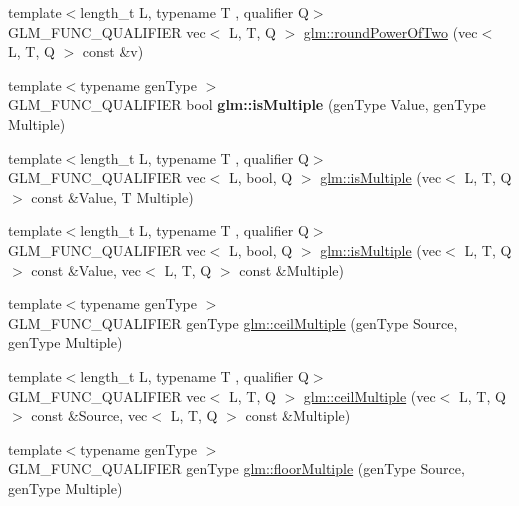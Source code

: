 \begin{DoxyCompactItemize}
\item 
{\footnotesize template$<$length\+\_\+t L, typename T , qualifier Q$>$ }\\G\+L\+M\+\_\+\+F\+U\+N\+C\+\_\+\+Q\+U\+A\+L\+I\+F\+I\+ER vec$<$ L, T, Q $>$ \hyperlink{group__gtc__round_ga258802a7d55c03c918f28cf4d241c4d0}{glm\+::round\+Power\+Of\+Two} (vec$<$ L, T, Q $>$ const \&v)
\item 
\mbox{\label{round_8inl_a1749b696a2f7a956da67d67a557ae134}} 
{\footnotesize template$<$typename gen\+Type $>$ }\\G\+L\+M\+\_\+\+F\+U\+N\+C\+\_\+\+Q\+U\+A\+L\+I\+F\+I\+ER bool {\bfseries glm\+::is\+Multiple} (gen\+Type Value, gen\+Type Multiple)
\item 
{\footnotesize template$<$length\+\_\+t L, typename T , qualifier Q$>$ }\\G\+L\+M\+\_\+\+F\+U\+N\+C\+\_\+\+Q\+U\+A\+L\+I\+F\+I\+ER vec$<$ L, bool, Q $>$ \hyperlink{group__gtc__round_ga354caf634ef333d9cb4844407416256a}{glm\+::is\+Multiple} (vec$<$ L, T, Q $>$ const \&Value, T Multiple)
\item 
{\footnotesize template$<$length\+\_\+t L, typename T , qualifier Q$>$ }\\G\+L\+M\+\_\+\+F\+U\+N\+C\+\_\+\+Q\+U\+A\+L\+I\+F\+I\+ER vec$<$ L, bool, Q $>$ \hyperlink{group__gtc__round_gabb4360e38c0943d8981ba965dead519d}{glm\+::is\+Multiple} (vec$<$ L, T, Q $>$ const \&Value, vec$<$ L, T, Q $>$ const \&Multiple)
\item 
{\footnotesize template$<$typename gen\+Type $>$ }\\G\+L\+M\+\_\+\+F\+U\+N\+C\+\_\+\+Q\+U\+A\+L\+I\+F\+I\+ER gen\+Type \hyperlink{group__gtc__round_ga1d89ac88582aaf4d5dfa5feb4a376fd4}{glm\+::ceil\+Multiple} (gen\+Type Source, gen\+Type Multiple)
\item 
{\footnotesize template$<$length\+\_\+t L, typename T , qualifier Q$>$ }\\G\+L\+M\+\_\+\+F\+U\+N\+C\+\_\+\+Q\+U\+A\+L\+I\+F\+I\+ER vec$<$ L, T, Q $>$ \hyperlink{group__gtc__round_gab77fdcc13f8e92d2e0b1b7d7aeab8e9d}{glm\+::ceil\+Multiple} (vec$<$ L, T, Q $>$ const \&Source, vec$<$ L, T, Q $>$ const \&Multiple)
\item 
{\footnotesize template$<$typename gen\+Type $>$ }\\G\+L\+M\+\_\+\+F\+U\+N\+C\+\_\+\+Q\+U\+A\+L\+I\+F\+I\+ER gen\+Type \hyperlink{group__gtc__round_ga2ffa3cd5f2ea746ee1bf57c46da6315e}{glm\+::floor\+Multiple} (gen\+Type Source, gen\+Type Multiple)
\item 

\end{DoxyCompactItemize}
